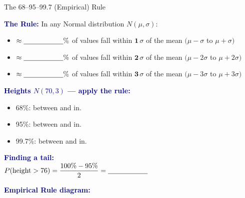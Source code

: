 \documentclass[10pt]{article}
\begin{document}
\vspace{0.08in}

\boxguard
\begin{notesbox}{The 68--95--99.7 (Empirical) Rule}
\small
\begin{multicols}{2}

\textbf{\textcolor{navy}{The Rule:}} In any Normal distribution $N(\mu, \sigma)$:
\begin{itemize}[itemsep=4pt]
  \item $\approx \blank{2cm}\%$ of values fall
        within $\mathbf{1}\,\sigma$ of the mean
        \hfill $(\mu - \sigma$ to $\mu + \sigma)$
  \item $\approx \blank{2cm}\%$ of values fall
        within $\mathbf{2}\,\sigma$ of the mean
        \hfill $(\mu - 2\sigma$ to $\mu + 2\sigma)$
  \item $\approx \blank{2cm}\%$ of values fall
        within $\mathbf{3}\,\sigma$ of the mean
        \hfill $(\mu - 3\sigma$ to $\mu + 3\sigma)$
\end{itemize}

\vspace{6pt}
\textbf{\textcolor{navy}{Heights $N(70,3)$ — apply the rule:}}
\begin{itemize}[itemsep=3pt]
  \item 68\%: between \blank{1.5cm} and \blank{1.5cm} in.
  \item 95\%: between \blank{1.5cm} and \blank{1.5cm} in.
  \item 99.7\%: between \blank{1.5cm} and \blank{1.5cm} in.
\end{itemize}

\vspace{6pt}
\textbf{\textcolor{navy}{Finding a tail:}}\\
$P(\text{height} > 76) = \dfrac{100\% - 95\%}{2} = \blank{2cm}$

\columnbreak

\textbf{\textcolor{navy}{Empirical Rule diagram:}}


\end{multicols}
\end{notesbox}
\end{document}
